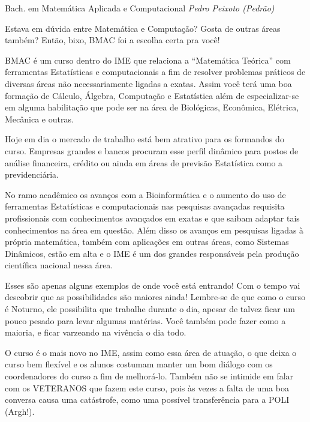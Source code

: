 \begin{subsecao}{Bach. em Matemática Aplicada e Computacional}
{\em Pedro Peixoto (Pedrão)}

Estava em dúvida entre Matemática e Computação? Gosta de outras áreas também?
Então, bixo, BMAC foi a escolha certa pra você!

BMAC é um curso dentro do IME que relaciona a ``Matemática Teórica'' com
ferramentas Estatísticas e computacionais a fim de resolver problemas práticos
de diversas áreas não necessariamente ligadas a exatas. Assim você terá uma boa
formação de Cálculo, Álgebra, Computação e Estatística além de especializar-se
em alguma habilitação que pode ser na área de Biológicas, Econômica, Elétrica,
Mecânica e outras.

Hoje em dia o mercado de trabalho está bem atrativo para os formandos do curso.
Empresas grandes e bancos procuram esse perfil dinâmico para postos de análise
financeira, crédito ou ainda em áreas de previsão Estatística como a
previdenciária.

No ramo acadêmico os avanços com a Bioinformática e o aumento do uso de
ferramentas Estatísticas e computacionais nas pesquisas avançadas requisita
profissionais com conhecimentos avançados em exatas e que saibam adaptar tais
conhecimentos na área em questão. Além disso os avanços em pesquisas ligadas à
própria matemática, também com aplicações em outras áreas, como Sistemas
Dinâmicos, estão em alta e o IME é um dos grandes responsáveis pela produção
científica nacional nessa área.

Esses são apenas alguns exemplos de onde você está entrando! Com o tempo vai
descobrir que as possibilidades são maiores ainda! Lembre-se de que como o
curso é Noturno, ele possibilita que trabalhe durante o dia, apesar de talvez
ficar um pouco pesado para levar algumas matérias. Você também pode fazer como
a maioria, e ficar varzeando na vivência o dia todo.

O curso é o mais novo no IME, assim como essa área de atuação, o que deixa o
curso bem flexível e os alunos costumam manter um bom diálogo com os
coordenadores do curso a fim de melhorá-lo. Também não se intimide em falar com
os VETERANOS que fazem este curso, pois às vezes a falta de uma boa conversa
causa uma catástrofe, como uma possível transferência para a POLI (Argh!).

\end{subsecao}
